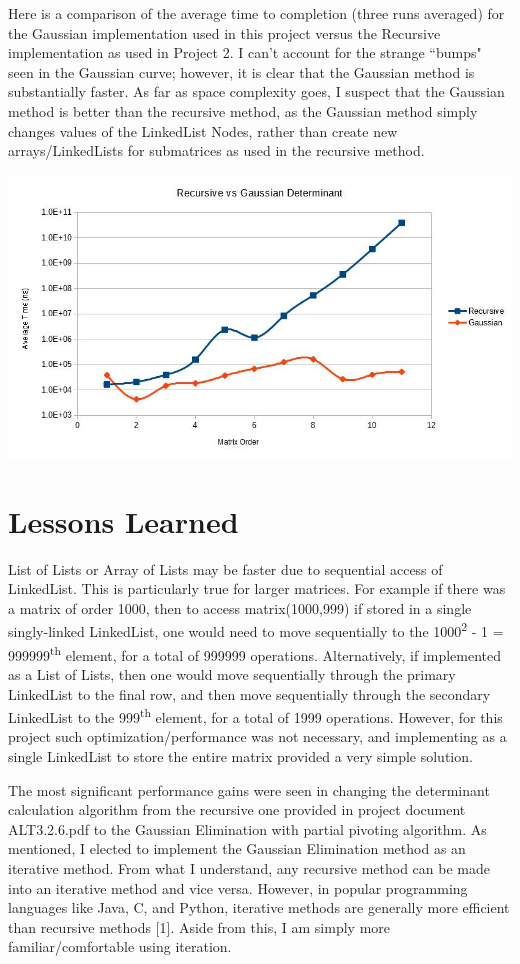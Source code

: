 \documentclass[12pt, titlepage]{article}
\begin{document}
Here is a comparison of the average time to completion (three runs averaged) for the Gaussian implementation used in this project versus the Recursive implementation as used in Project 2. I can't account for the strange ``bumps" seen in the Gaussian curve; however, it is clear that the Gaussian method is substantially faster. As far as space complexity goes, I suspect that the Gaussian method is better than the recursive method, as the Gaussian method simply changes values of the LinkedList Nodes, rather than create new arrays/LinkedLists for submatrices as used in the recursive method.

\includegraphics[width=\textwidth]{compare}




\section{Lessons Learned}

List of Lists or Array of Lists may be faster due to sequential access of LinkedList. This is particularly true for larger matrices. For example if there was a matrix of order 1000, then to access matrix(1000,999) if stored in a single singly-linked LinkedList, one would need to move sequentially to the 1000\textsuperscript{2} - 1 = 999999\textsuperscript{th} element, for a total of 999999 operations. Alternatively, if implemented as a List of Lists, then one would move sequentially through the primary LinkedList to the final row, and then move sequentially through the secondary LinkedList to the 999\textsuperscript{th} element, for a total of 1999 operations. However, for this project such optimization/performance was not necessary, and implementing as a single LinkedList to store the entire matrix provided a very simple solution.
 
The most significant performance gains were seen in changing the determinant calculation algorithm from the recursive one provided in project document ALT3.2.6.pdf to the Gaussian Elimination with partial pivoting algorithm. As mentioned, I elected to implement the Gaussian Elimination method as an iterative method. From what I understand, any recursive method can be made into an iterative method and vice versa. However, in popular programming languages like Java, C, and Python, iterative methods are generally more efficient than recursive methods [1]. Aside from this, I am simply more familiar/comfortable using iteration.
 
\end{document}
